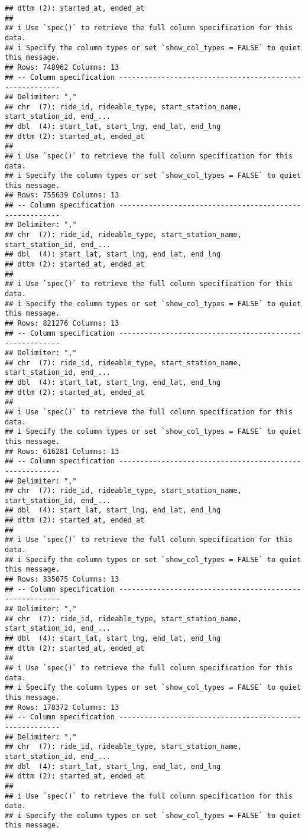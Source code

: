 \documentclass[
]{article}
\begin{document}
\begin{verbatim}
## dttm (2): started_at, ended_at
## 
## i Use `spec()` to retrieve the full column specification for this data.
## i Specify the column types or set `show_col_types = FALSE` to quiet this message.
## Rows: 748962 Columns: 13
## -- Column specification --------------------------------------------------------
## Delimiter: ","
## chr  (7): ride_id, rideable_type, start_station_name, start_station_id, end_...
## dbl  (4): start_lat, start_lng, end_lat, end_lng
## dttm (2): started_at, ended_at
## 
## i Use `spec()` to retrieve the full column specification for this data.
## i Specify the column types or set `show_col_types = FALSE` to quiet this message.
## Rows: 755639 Columns: 13
## -- Column specification --------------------------------------------------------
## Delimiter: ","
## chr  (7): ride_id, rideable_type, start_station_name, start_station_id, end_...
## dbl  (4): start_lat, start_lng, end_lat, end_lng
## dttm (2): started_at, ended_at
## 
## i Use `spec()` to retrieve the full column specification for this data.
## i Specify the column types or set `show_col_types = FALSE` to quiet this message.
## Rows: 821276 Columns: 13
## -- Column specification --------------------------------------------------------
## Delimiter: ","
## chr  (7): ride_id, rideable_type, start_station_name, start_station_id, end_...
## dbl  (4): start_lat, start_lng, end_lat, end_lng
## dttm (2): started_at, ended_at
## 
## i Use `spec()` to retrieve the full column specification for this data.
## i Specify the column types or set `show_col_types = FALSE` to quiet this message.
## Rows: 616281 Columns: 13
## -- Column specification --------------------------------------------------------
## Delimiter: ","
## chr  (7): ride_id, rideable_type, start_station_name, start_station_id, end_...
## dbl  (4): start_lat, start_lng, end_lat, end_lng
## dttm (2): started_at, ended_at
## 
## i Use `spec()` to retrieve the full column specification for this data.
## i Specify the column types or set `show_col_types = FALSE` to quiet this message.
## Rows: 335075 Columns: 13
## -- Column specification --------------------------------------------------------
## Delimiter: ","
## chr  (7): ride_id, rideable_type, start_station_name, start_station_id, end_...
## dbl  (4): start_lat, start_lng, end_lat, end_lng
## dttm (2): started_at, ended_at
## 
## i Use `spec()` to retrieve the full column specification for this data.
## i Specify the column types or set `show_col_types = FALSE` to quiet this message.
## Rows: 178372 Columns: 13
## -- Column specification --------------------------------------------------------
## Delimiter: ","
## chr  (7): ride_id, rideable_type, start_station_name, start_station_id, end_...
## dbl  (4): start_lat, start_lng, end_lat, end_lng
## dttm (2): started_at, ended_at
## 
## i Use `spec()` to retrieve the full column specification for this data.
## i Specify the column types or set `show_col_types = FALSE` to quiet this message.
\end{verbatim}
\end{document}
